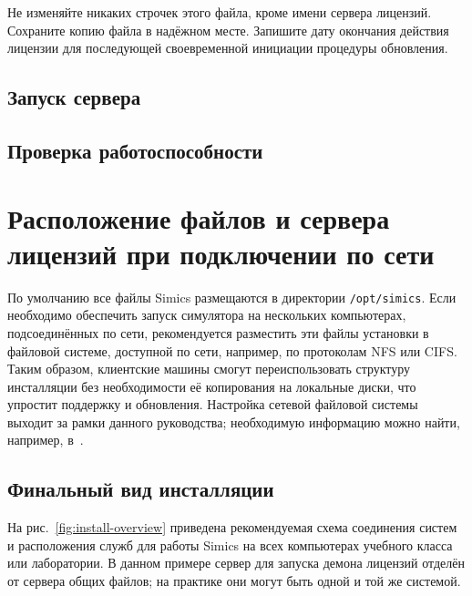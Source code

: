 Не изменяйте никаких строчек этого файла, кроме имени сервера лицензий. Сохраните копию файла в надёжном месте. Запишите дату окончания действия лицензии для последующей своевременной инициации процедуры обновления.

\subsection{Запуск сервера}

\subsection{Проверка работоспособности}



\section{Расположение файлов и сервера лицензий при подключении по сети}

По умолчанию все файлы Simics размещаются в директории \texttt{/opt/simics}. Если необходимо обеспечить запуск симулятора на нескольких компьютерах, подсоединённых по сети, рекомендуется разместить эти файлы установки в файловой системе, доступной по сети, например, по протоколам NFS или CIFS. Таким образом, клиентские машины смогут переиспользовать структуру инсталляции без необходимости её копирования на локальные диски, что упростит поддержку и обновления. Настройка сетевой файловой системы выходит за рамки данного руководства; необходимую информацию можно найти, например, в~\cite{nfs}.

\subsection{Финальный вид инсталляции}

На рис.~\ref{fig:install-overview} приведена рекомендуемая схема соединения систем и расположения служб для работы Simics на всех компьютерах учебного класса или лаборатории. В данном примере сервер для запуска демона лицензий отделён от сервера общих файлов; на практике они могут быть одной и той же системой.

